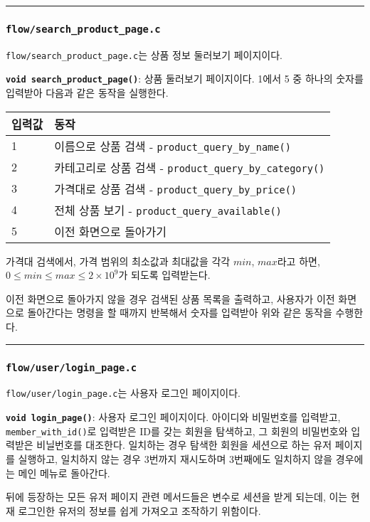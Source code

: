 \documentclass[runningheads]{llncs}
\begin{document}
\noindent\rule{2cm}{0.4pt}

\subsubsection{\texttt{flow/search_product_page.c}}
\texttt{flow/search_product_page.c}는 상품 정보 둘러보기 페이지이다.

\textbf{\texttt{void search_product_page()}}: 상품 둘러보기 페이지이다. 1에서 5 중 하나의 숫자를 입력받아 다음과 같은 동작을 실행한다.

\begin{tabularx}{\textwidth}{l|X}
	\hline
		입력값	& 동작 \\
	\hline
		1 & 이름으로 상품 검색 - \texttt{product_query_by_name()} \\
		2 & 카테고리로 상품 검색 - \texttt{product_query_by_category()} \\
		3 & 가격대로 상품 검색 - \texttt{product_query_by_price()} \\
		4 & 전체 상품 보기 - \texttt{product_query_available()} \\
		5 & 이전 화면으로 돌아가기 \\
	\hline
\end{tabularx}

가격대 검색에서, 가격 범위의 최소값과 최대값을 각각 $min$, $max$라고 하면, $0 \leq min \leq max \leq 2 \times {10}^{9}$가 되도록 입력받는다.

이전 화면으로 돌아가지 않을 경우 검색된 상품 목록을 출력하고, 사용자가 이전 화면으로 돌아간다는 명령을 할 때까지 반복해서 숫자를 입력받아 위와 같은 동작을 수행한다.

\noindent\rule{2cm}{0.4pt}

\subsubsection{\texttt{flow/user/login_page.c}}
\texttt{flow/user/login_page.c}는 사용자 로그인 페이지이다.

\textbf{\texttt{void login_page()}}: 사용자 로그인 페이지이다. 아이디와 비밀번호를 입력받고, \texttt{member_with_id()}로 입력받은 ID를 갖는 회원을 탐색하고, 그 회원의 비밀번호와 입력받은 비닐번호를 대조한다. 일치하는 경우 탐색한 회원을 세션으로 하는 유저 페이지를 실행하고, 일치하지 않는 경우 3번까지 재시도하며 3번째에도 일치하지 않을 경우에는 메인 메뉴로 돌아간다.

뒤에 등장하는 모든 유저 페이지 관련 메서드들은 변수로 세션을 받게 되는데, 이는 현재 로그인한 유저의 정보를 쉽게 가져오고 조작하기 위함이다.
\end{document}
